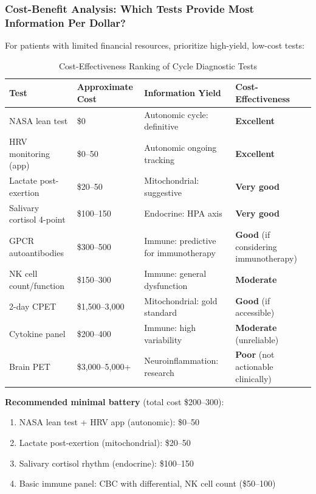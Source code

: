 \subsubsection{Cost-Benefit Analysis: Which Tests Provide Most Information Per Dollar?}

For patients with limited financial resources, prioritize high-yield, low-cost tests:

\begin{table}[htbp]
\centering
\caption{Cost-Effectiveness Ranking of Cycle Diagnostic Tests}
\label{tab:cycle-test-cost-effectiveness}
\small
\begin{tabular}{@{}p{4cm}p{2.5cm}p{3cm}p{4cm}@{}}
\toprule
\textbf{Test} & \textbf{Approximate Cost} & \textbf{Information Yield} & \textbf{Cost-Effectiveness} \\
\midrule
NASA lean test & \$0 & Autonomic cycle: definitive & \textbf{Excellent} \\
HRV monitoring (app) & \$0--50 & Autonomic ongoing tracking & \textbf{Excellent} \\
Lactate post-exertion & \$20--50 & Mitochondrial: suggestive & \textbf{Very good} \\
Salivary cortisol 4-point & \$100--150 & Endocrine: HPA axis & \textbf{Very good} \\
GPCR autoantibodies & \$300--500 & Immune: predictive for immunotherapy & \textbf{Good} (if considering immunotherapy) \\
NK cell count/function & \$150--300 & Immune: general dysfunction & \textbf{Moderate} \\
2-day CPET & \$1,500--3,000 & Mitochondrial: gold standard & \textbf{Good} (if accessible) \\
Cytokine panel & \$200--400 & Immune: high variability & \textbf{Moderate} (unreliable) \\
Brain PET & \$3,000--5,000+ & Neuroinflammation: research & \textbf{Poor} (not actionable clinically) \\
\bottomrule
\end{tabular}
\end{table}

\textbf{Recommended minimal battery} (total cost \$200--300):
\begin{enumerate}
    \item NASA lean test + HRV app (autonomic): \$0--50
    \item Lactate post-exertion (mitochondrial): \$20--50
    \item Salivary cortisol rhythm (endocrine): \$100--150
    \item Basic immune panel: CBC with differential, NK cell count (\$50--100)
\end{enumerate}

